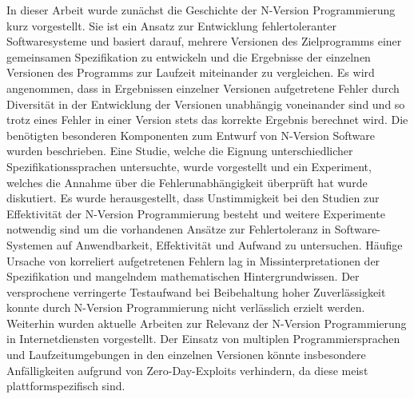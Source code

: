 %
In dieser Arbeit wurde zunächst die Geschichte der N-Version Programmierung kurz vorgestellt.
Sie ist ein Ansatz zur Entwicklung fehlertoleranter Softwaresysteme und basiert darauf, mehrere Versionen des Zielprogramms einer gemeinsamen Spezifikation zu entwickeln und die Ergebnisse der einzelnen Versionen des Programms zur Laufzeit miteinander zu vergleichen.
Es wird angenommen, dass in Ergebnissen einzelner Versionen aufgetretene Fehler durch Diversität in der Entwicklung der Versionen unabhängig voneinander sind und so trotz eines Fehler in einer Version stets das korrekte Ergebnis berechnet wird.
Die benötigten besonderen Komponenten zum Entwurf von N-Version Software wurden beschrieben.
Eine Studie, welche die Eignung unterschiedlicher Spezifikationssprachen untersuchte, wurde vorgestellt und ein Experiment, welches die Annahme über die Fehlerunabhängigkeit überprüft hat wurde diskutiert. Es wurde herausgestellt, dass Unstimmigkeit bei den Studien zur Effektivität der N-Version Programmierung besteht und weitere Experimente notwendig sind um die vorhandenen Ansätze zur Fehlertoleranz in Software-Systemen auf Anwendbarkeit, Effektivität und Aufwand zu untersuchen.
Häufige Ursache von korreliert aufgetretenen Fehlern lag in Missinterpretationen der Spezifikation und mangelndem mathematischen Hintergrundwissen. Der versprochene verringerte Testaufwand bei Beibehaltung hoher Zuverlässigkeit konnte durch N-Version Programmierung nicht verlässlich erzielt werden.
Weiterhin wurden aktuelle Arbeiten zur Relevanz der N-Version Programmierung in Internetdiensten vorgestellt. Der Einsatz von multiplen Programmiersprachen und Laufzeitumgebungen in den einzelnen Versionen könnte insbesondere Anfälligkeiten aufgrund von Zero-Day-Exploits verhindern, da diese meist plattformspezifisch sind.



